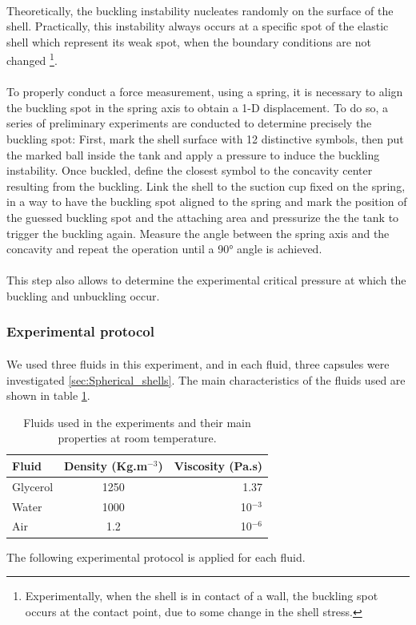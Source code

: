 \paragraph{}
Theoretically, the buckling instability nucleates randomly  on the surface of the shell. Practically, this instability always occurs at a specific spot of the elastic shell which represent its weak spot, when the boundary conditions are not changed \footnote{Experimentally, when the shell is in contact of a wall, the buckling spot occurs at the contact point, due to some change in the shell stress.}.
\paragraph{}
To properly conduct a force measurement, using a spring, it is necessary to align the buckling spot in the spring axis to obtain a 1-D displacement. To do so, a series of preliminary experiments are conducted to determine precisely the buckling spot:
First, mark the shell surface with 12 distinctive symbols, then put the marked ball inside the tank and apply a pressure to induce the buckling instability. Once buckled, define the closest symbol to the concavity center resulting from the buckling. Link the shell to the suction cup fixed on the spring, in a way to have the buckling spot aligned to the spring and mark the position of the guessed buckling spot and the attaching area and pressurize the the tank to trigger the buckling again. Measure the angle between the spring axis and the concavity and repeat the operation until a 90° angle is achieved. 
\paragraph{}
This step also allows to determine the experimental critical pressure at which the buckling and unbuckling occur.
\subsubsection{Experimental protocol}
\paragraph{}
We used three fluids in this experiment, and in each fluid, three capsules were investigated \ref{sec:Spherical_shells}.
The main characteristics of the fluids used are shown in table \ref{tab:fluid_carac_spring}. 
\begin{table}[H]
	\centering
		\begin{tabular}{|l|c|r|}
			\hline
			Fluid & Density (Kg.m$^{-3}$) & Viscosity (Pa.s)\\
			\hline
			Glycerol & 1250 & 1.37 \\
			\hline
			Water & 1000 & 10$^{-3} $\\
			\hline
			Air &  1.2 & 10$^{-6}$\\
			\hline
		\end{tabular}
	\caption{Fluids used in the experiments and their main properties at room temperature.}
	\label{tab:fluid_carac_spring}
\end{table}
The following experimental protocol is applied for each fluid.
